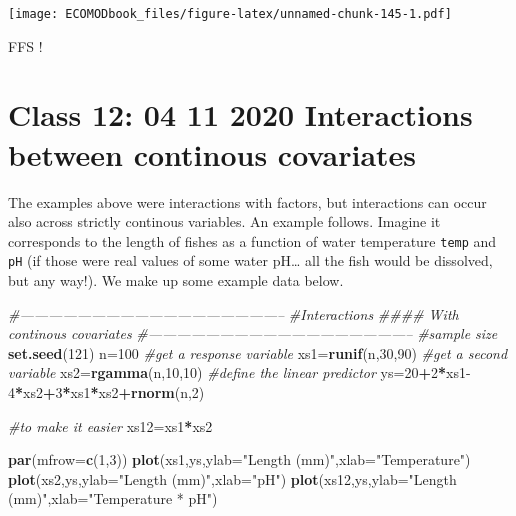\documentclass[
]{book}
\newenvironment{Shaded}{\begin{snugshade}}{\end{snugshade}}
\newcommand{\CommentTok}[1]{\textcolor[rgb]{0.56,0.35,0.01}{\textit{#1}}}
\newcommand{\DataTypeTok}[1]{\textcolor[rgb]{0.13,0.29,0.53}{#1}}
\newcommand{\DecValTok}[1]{\textcolor[rgb]{0.00,0.00,0.81}{#1}}
\newcommand{\KeywordTok}[1]{\textcolor[rgb]{0.13,0.29,0.53}{\textbf{#1}}}
\newcommand{\NormalTok}[1]{#1}
\newcommand{\OperatorTok}[1]{\textcolor[rgb]{0.81,0.36,0.00}{\textbf{#1}}}
\newcommand{\StringTok}[1]{\textcolor[rgb]{0.31,0.60,0.02}{#1}}
\begin{document}
\texttt{[image: ECOMODbook\_files/figure-latex/unnamed-chunk-145-1.pdf]}

FFS !

\hypertarget{aula13}{%
\chapter{Class 12: 04 11 2020 Interactions between continous covariates}\label{aula13}}

The examples above were interactions with factors, but interactions can occur also across strictly continous variables. An example follows. Imagine it corresponds to the length of fishes as a function of water temperature \texttt{temp} and \texttt{pH} (if those were real values of some water pH\ldots{} all the fish would be dissolved, but any way!). We make up some example data below.

\begin{Shaded}
\begin{Highlighting}[]
\CommentTok{#--------------------------------------------------------}
\CommentTok{#Interactions}
\CommentTok{#### With continous covariates}
\CommentTok{#--------------------------------------------------------}
\CommentTok{#sample size}
\KeywordTok{set.seed}\NormalTok{(}\DecValTok{121}\NormalTok{)}
\NormalTok{n=}\DecValTok{100}
\CommentTok{#get a response variable}
\NormalTok{xs1=}\KeywordTok{runif}\NormalTok{(n,}\DecValTok{30}\NormalTok{,}\DecValTok{90}\NormalTok{)}
\CommentTok{#get a second variable}
\NormalTok{xs2=}\KeywordTok{rgamma}\NormalTok{(n,}\DecValTok{10}\NormalTok{,}\DecValTok{10}\NormalTok{)}
\CommentTok{#define the linear predictor}
\NormalTok{ys=}\DecValTok{20}\OperatorTok{+}\DecValTok{2}\OperatorTok{*}\NormalTok{xs1}\DecValTok{-4}\OperatorTok{*}\NormalTok{xs2}\OperatorTok{+}\DecValTok{3}\OperatorTok{*}\NormalTok{xs1}\OperatorTok{*}\NormalTok{xs2}\OperatorTok{+}\KeywordTok{rnorm}\NormalTok{(n,}\DecValTok{2}\NormalTok{)}

\CommentTok{#to make it easier}
\NormalTok{xs12=xs1}\OperatorTok{*}\NormalTok{xs2}

\KeywordTok{par}\NormalTok{(}\DataTypeTok{mfrow=}\KeywordTok{c}\NormalTok{(}\DecValTok{1}\NormalTok{,}\DecValTok{3}\NormalTok{))}
\KeywordTok{plot}\NormalTok{(xs1,ys,}\DataTypeTok{ylab=}\StringTok{"Length (mm)"}\NormalTok{,}\DataTypeTok{xlab=}\StringTok{"Temperature"}\NormalTok{)}
\KeywordTok{plot}\NormalTok{(xs2,ys,}\DataTypeTok{ylab=}\StringTok{"Length (mm)"}\NormalTok{,}\DataTypeTok{xlab=}\StringTok{"pH"}\NormalTok{)}
\KeywordTok{plot}\NormalTok{(xs12,ys,}\DataTypeTok{ylab=}\StringTok{"Length (mm)"}\NormalTok{,}\DataTypeTok{xlab=}\StringTok{"Temperature * pH"}\NormalTok{)}
\end{Highlighting}
\end{Shaded}
\end{document}
